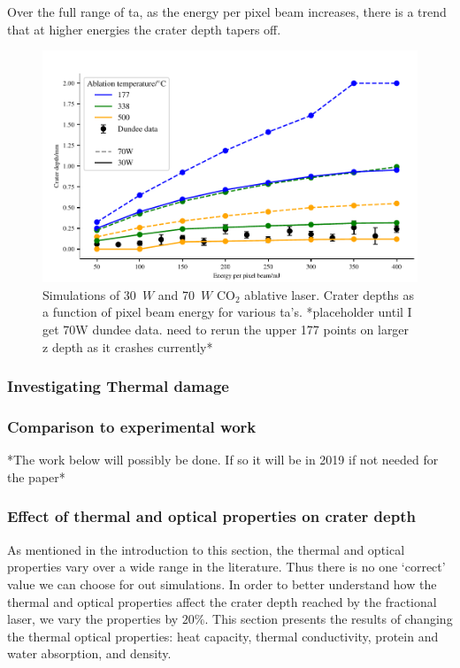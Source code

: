 Over the full range of \gls{ta}, as the energy per pixel beam increases, there is a trend that at higher energies the crater depth tapers off.  


\begin{figure}
	\centering
    \includegraphics[width=\columnwidth]{./ablation/images/both.pdf}
    \caption{Simulations of 30~$W$ and 70~$W$ CO$_2$ ablative laser. Crater depths as a function of pixel beam energy for various \gls{ta}'s. *placeholder until I get 70W dundee data. need to rerun the upper 177 points on larger z depth as it crashes currently*}\label{fig:ta}
\end{figure}
 

\subsubsection{Investigating Thermal damage} 
 
\subsubsection{Comparison to experimental work} 
 
*The work below will possibly be done. If so it will be in 2019 if not needed for the paper*
\subsubsection{Effect of thermal and optical properties on crater depth}

As mentioned in the introduction to this section, the thermal and optical properties vary over a wide range in the literature. Thus there is no one `correct' value we can choose for out simulations. In order to better understand how the thermal and optical properties affect the crater depth reached by the fractional laser, we vary the properties by $20\%$. This section presents the results of changing the thermal optical properties: heat capacity, thermal conductivity, protein and water absorption, and density.

